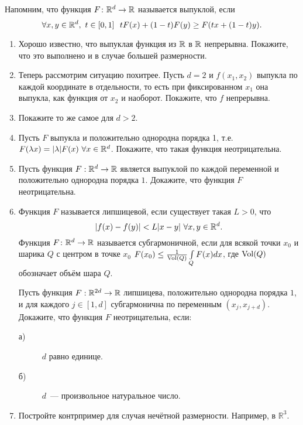 Напомним, что функция $F\colon\mathbb{R}^d\to\mathbb{R}$ называется выпуклой, если
$$\forall x,y\in\mathbb{R}^d,\,\, t\in [0,1]\,\,\,\, tF(x)+(1-t)F(y)\geq F(tx+(1-t)y).$$
\begin{enumerate}
\item Хорошо известно, что выпуклая функция из $\mathbb{R}$ в $\mathbb{R}$ непрерывна. Покажите, что это выполнено и в случае большей размерности.
\item Теперь рассмотрим ситуацию похитрее. Пусть $d=2$ и $f(x_1, x_2)$ выпукла по каждой координате в отдельности, то есть при фиксированном $x_1$ она выпукла, как функция от $x_2$ и наоборот. Покажите, что $f$ непрерывна.
\item Покажите то же самое для $d>2$.
\item Пусть $F$ выпукла и положительно однородна порядка 1, т.е. $F(\lambda x)=|\lambda|F(x)\,\,\forall x\in \mathbb{R}^d$. Покажите, что такая функция неотрицательна.

\item Пусть функция $F: \mathbb{R}^d \to \mathbb{R}$ является выпуклой по каждой переменной и положительно однородна порядка $1$. Докажите, что функция $F$ неотрицательна.

\item Функция $F$ называется липшицевой, если существует такая $L>0$, что $$|f(x)-f(y)|<L|x-y|\,\, \forall x,y\in \mathbb{R}^d.$$ Функция $F\colon \mathbb{R}^d\to \mathbb{R}$ называется субгармоничной, если для всякой точки $x_0$ и шарика $Q$ с центром в точке $x_0$ ${F(x_0)} \leq \frac{1}{\operatorname{Vol}(Q)} \int\limits_{Q} F(x) dx $, где $\operatorname{Vol}(Q)$ обозначает объём шара $Q$.

 Пусть функция $F: \mathbb{R}^{2d} \to \mathbb{R}$ липшицева, положительно однородна порядка $1$, и для каждого $j \in [1,d]$ субгармонична по переменным $(x_j, x_{j+d})$.  Докажите, что функция $F$ неотрицательна, если:
\begin{description}
\item[а)] $d$ равно единице.
\item[б)] $d$~— произвольное натуральное число.

\end{description}

\item Постройте контрпример для случая нечётной размерности. Например, в $\mathbb{R}^3$.
\end{enumerate}